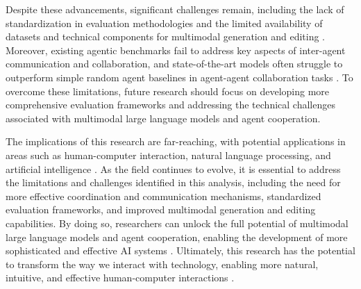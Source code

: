 \documentclass[conference]{IEEEtran}
\begin{document}
Despite these advancements, significant challenges remain, including the lack of standardization in evaluation methodologies and the limited availability of datasets and technical components for multimodal generation and editing \cite{b8}. Moreover, existing agentic benchmarks fail to address key aspects of inter-agent communication and collaboration, and state-of-the-art models often struggle to outperform simple random agent baselines in agent-agent collaboration tasks \cite{b9}. To overcome these limitations, future research should focus on developing more comprehensive evaluation frameworks and addressing the technical challenges associated with multimodal large language models and agent cooperation.

The implications of this research are far-reaching, with potential applications in areas such as human-computer interaction, natural language processing, and artificial intelligence \cite{b10}. As the field continues to evolve, it is essential to address the limitations and challenges identified in this analysis, including the need for more effective coordination and communication mechanisms, standardized evaluation frameworks, and improved multimodal generation and editing capabilities. By doing so, researchers can unlock the full potential of multimodal large language models and agent cooperation, enabling the development of more sophisticated and effective AI systems \cite{b11}. Ultimately, this research has the potential to transform the way we interact with technology, enabling more natural, intuitive, and effective human-computer interactions \cite{b12}.
\end{document}
